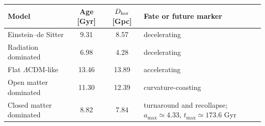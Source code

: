 \begingroup
\small
\begin{tabularx}{\textwidth}{@{}>{\raggedright\arraybackslash}p{}cc>{\raggedright\arraybackslash}X@{}}
\toprule
Model & Age [Gyr] & $D_{\rm hor}$ [Gpc] & Fate or future marker \\
\midrule
Einstein--de Sitter & 9.31 & 8.57 & decelerating \\
Radiation dominated & 6.98 & 4.28 & decelerating \\
Flat $\Lambda$CDM-like & 13.46 & 13.89 & accelerating \\
Open matter dominated & 11.30 & 12.39 & curvature-coasting \\
Closed matter dominated & 8.82 & 7.84 & turnaround and recollapse; $a_{\max}\simeq 4.33$, $t_{\max}\simeq 173.6$ Gyr \\
\bottomrule
\end{tabularx}
\endgroup